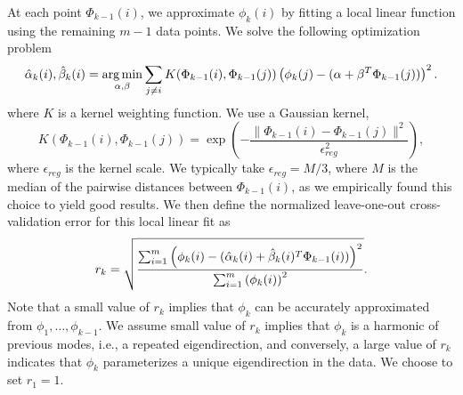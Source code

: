 At each point $\Phi_{k-1}(i)$, we approximate $\phi_k(i)$ by fitting a local linear function using the remaining $m-1$ data points.
%
We solve the following optimization problem
\begin{equation} \label{eq:opt_problem}
\hat{\alpha}_k (i) , \hat{\beta}_k(i)  = \operatorname*{arg\,min}_{\alpha, \beta} \sum_{j \ne i} K(\Phi_{k-1}(i), \Phi_{k-1}(j)) \left( \phi_{k}(j) - (\alpha + \beta^T \Phi_{k-1}(j)) \right)^2.
\end{equation}
%
where $K$ is a kernel weighting function.
%
We use a Gaussian kernel,
%
\begin{equation}
K(\Phi_{k-1}(i), \Phi_{k-1}(j))  = \exp \left( - \frac{\|\Phi_{k-1}(i) - \Phi_{k-1} (j) \|^2}{\epsilon_{reg}^2} \right),
\end{equation}
%
where $\epsilon_{reg}$ is the kernel scale.
%
We typically take $\epsilon_{reg} = M / 3$, where $M$ is the median of the pairwise distances between $\Phi_{k-1}(i)$, as we empirically found this choice to yield good results.
%
We then define the normalized leave-one-out cross-validation error for this local linear fit as
\begin{equation} \label{eq:cv_error}
r_{k} = \sqrt{ \frac{\sum_{i=1}^m \left( \phi_{k} (i) - (\hat{\alpha}_k(i) + \hat{\beta}_k(i)^T \Phi_{k-1}(i))  \right)^2} {\sum_{i=1}^m  \left( \phi_{k} (i) \right)^2 }}.
\end{equation}
%
Note that a small value of $r_k$ implies that $\phi_{k}$ can be accurately approximated from $\phi_1, \dots, \phi_{k-1}$.
%
We assume small value of $r_k$ implies that $\phi_k$ is a harmonic of previous modes, i.e., a repeated eigendirection, and conversely, a large value of $r_{k}$ indicates that $\phi_{k}$ parameterizes a unique eigendirection in the data.
%
We choose to set $r_1 = 1$.
%

